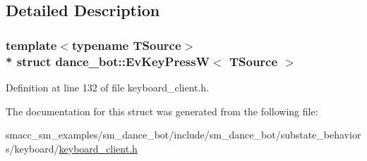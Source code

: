 \subsection{Detailed Description}
\subsubsection*{template$<$typename T\+Source$>$\\*
struct dance\+\_\+bot\+::\+Ev\+Key\+Press\+W$<$ T\+Source $>$}



Definition at line 132 of file keyboard\+\_\+client.\+h.



The documentation for this struct was generated from the following file\+:\begin{DoxyCompactItemize}
\item 
smacc\+\_\+sm\+\_\+examples/sm\+\_\+dance\+\_\+bot/include/sm\+\_\+dance\+\_\+bot/substate\+\_\+behaviors/keyboard/\hyperlink{keyboard__client_8h}{keyboard\+\_\+client.\+h}\end{DoxyCompactItemize}
